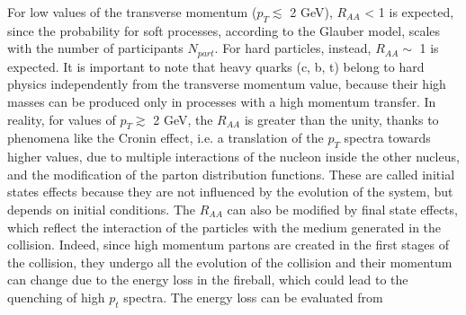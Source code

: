 For low values of the transverse momentum ($p_{T} \lesssim$ 2 GeV), $R_{AA}$ < 1 is expected, since the probability for soft processes, according to the Glauber model, scales with the number of participants $N_{part}$. For hard particles, instead, $R_{AA} \sim$ 1 is expected. It is important to note that heavy quarks (c, b, t) belong to hard physics independently from the transverse momentum value, because their high masses can be produced only in processes with a high momentum transfer. In reality, for values of $p_{T} \gtrsim$ 2 GeV, the $R_{AA}$ is greater than the unity, thanks to phenomena like the Cronin effect, i.e. a translation of the $p_{T}$ spectra towards higher values, due to multiple interactions of the nucleon inside the other nucleus, and the modification of the parton distribution functions. These are called initial states effects because they are not influenced by the evolution of the system, but depends on initial conditions. The $R_{AA}$ can also be modified by final state effects, which reflect the interaction of the particles with the medium generated in the collision. Indeed, since high momentum partons are created in the first stages of the collision, they undergo all the evolution of the collision and their momentum can change due to the energy loss in the fireball, which could lead to the quenching of high $p_{t}$ spectra. The energy loss can be evaluated from






